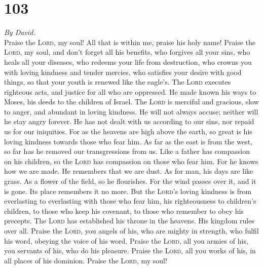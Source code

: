 \hypertarget{section-102}{%
\section{103}\label{section-102}}

\emph{By David.}\\
 Praise the \textsc{Lord}, my soul! All that is within me,
praise his holy name!  Praise the \textsc{Lord}, my soul,
and don't forget all his benefits,  who forgives all your
sins, who heals all your diseases,  who redeems your life
from destruction, who crowns you with loving kindness and tender
mercies,  who satisfies your desire with good things, so
that your youth is renewed like the eagle's.  The
\textsc{Lord} executes righteous acts, and justice for all who are
oppressed.  He made known his ways to Moses, his deeds to
the children of Israel.  The \textsc{Lord} is merciful and
gracious, slow to anger, and abundant in loving kindness. 
He will not always accuse; neither will he stay angry forever.
 He has not dealt with us according to our sins, nor
repaid us for our iniquities.  For as the heavens are
high above the earth, so great is his loving kindness towards those who
fear him.  As far as the east is from the west, so far
has he removed our transgressions from us.  Like a father
has compassion on his children, so the \textsc{Lord} has compassion on
those who fear him.  For he knows how we are made. He
remembers that we are dust.  As for man, his days are
like grass. As a flower of the field, so he flourishes. 
For the wind passes over it, and it is gone. Its place remembers it no
more.  But the \textsc{Lord}'s loving kindness is from
everlasting to everlasting with those who fear him, his righteousness to
children's children,  to those who keep his covenant, to
those who remember to obey his precepts.  The
\textsc{Lord} has established his throne in the heavens. His kingdom
rules over all.  Praise the \textsc{Lord}, you angels of
his, who are mighty in strength, who fulfil his word, obeying the voice
of his word.  Praise the \textsc{Lord}, all you armies of
his, you servants of his, who do his pleasure.  Praise
the \textsc{Lord}, all you works of his, in all places of his dominion.
Praise the \textsc{Lord}, my soul!

